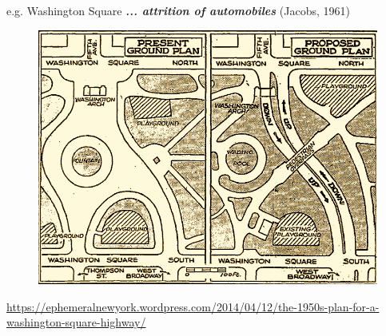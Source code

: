 \documentclass[aspectratio=169]{beamer}
\begin{document}
\begin{frame}
	
	e.g. Washington Square \textbf{\textit{... attrition of automobiles}} (Jacobs, 1961)
	
	\begin{figure}
		\centering
		\includegraphics[width=0.65\linewidth]{images/washsquare1950splan.png}
	\end{figure}


	\tiny\url{https://ephemeralnewyork.wordpress.com/2014/04/12/the-1950s-plan-for-a-washington-square-highway/}
	
\end{frame}
\end{document}
